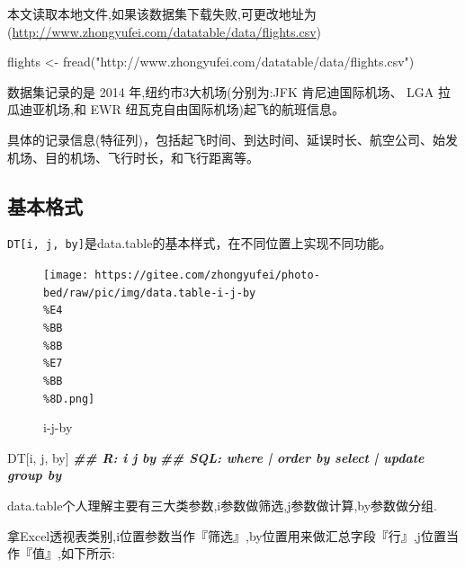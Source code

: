 \documentclass[
]{book}
\newenvironment{Shaded}{\begin{snugshade}}{\end{snugshade}}
\newcommand{\DocumentationTok}[1]{\textcolor[rgb]{0.56,0.35,0.01}{\textbf{\textit{#1}}}}
\newcommand{\FunctionTok}[1]{\textcolor[rgb]{0.00,0.00,0.00}{#1}}
\newcommand{\NormalTok}[1]{#1}
\newcommand{\OtherTok}[1]{\textcolor[rgb]{0.56,0.35,0.01}{#1}}
\newcommand{\StringTok}[1]{\textcolor[rgb]{0.31,0.60,0.02}{#1}}
\begin{document}
本文读取本地文件,如果该数据集下载失败,可更改地址为(\url{http://www.zhongyufei.com/datatable/data/flights.csv})

\begin{Shaded}
\begin{Highlighting}[]
\NormalTok{flights }\OtherTok{\textless{}{-}} \FunctionTok{fread}\NormalTok{(}\StringTok{"http://www.zhongyufei.com/datatable/data/flights.csv"}\NormalTok{)}
\end{Highlighting}
\end{Shaded}

数据集记录的是 2014 年,纽约市3大机场(分别为:JFK 肯尼迪国际机场、 LGA 拉瓜迪亚机场,和 EWR 纽瓦克自由国际机场)起飞的航班信息。

具体的记录信息(特征列)，包括起飞时间、到达时间、延误时长、航空公司、始发机场、目的机场、飞行时长，和飞行距离等。

\hypertarget{ux57faux672cux683cux5f0f}{%
\subsection{基本格式}\label{ux57faux672cux683cux5f0f}}

\texttt{DT{[}i,\ j,\ by{]}}是data.table的基本样式，在不同位置上实现不同功能。

\begin{figure}
\centering
\texttt{[image: https://gitee.com/zhongyufei/photo-bed/raw/pic/img/data.table-i-j-by\\\%E4\\\%BB\\\%8B\\\%E7\\\%BB\\\%8D.png]}
\caption{i-j-by}
\end{figure}

\begin{Shaded}
\begin{Highlighting}[]
\NormalTok{DT[i, j, by]}
\DocumentationTok{\#\#   R:                 i                 j        by}
\DocumentationTok{\#\# SQL:  where | order by   select | update  group by}
\end{Highlighting}
\end{Shaded}

data.table个人理解主要有三大类参数,i参数做筛选,j参数做计算,by参数做分组.

拿Excel透视表类别,i位置参数当作『筛选』,by位置用来做汇总字段『行』,j位置当作『值』,如下所示:
\end{document}
